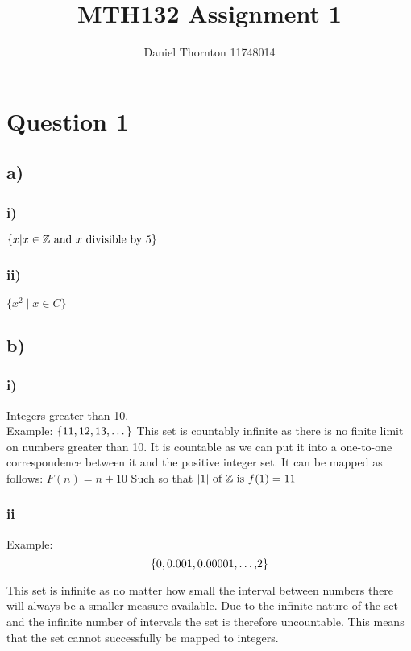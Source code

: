 \documentclass[english,10pt,a4paper]{report}
\title{MTH132 Assignment 1}
\author{Daniel Thornton 11748014 }
\begin{document}
	\pagestyle{fancy}
	\fancyhead{}
\fancyfoot{} %
\fancyfoot[LE,RO]{\thepage}
\maketitle

\section{Question 1}
\subsection*{a)}
	\hspace{2cm}\begin{minipage}{\dimexpr\textwidth-2cm}
	\indent	\subsubsection*{i)}
	$ \{x \vert x \in \mathbb{Z}	  \textmd{ and } x \textmd{ divisible by }  5\} $
	
	\subsubsection*{ii)}
	$ \{ x^2 \mid x \in C \} $
	
	\end{minipage}
	

\subsection*{b)}
\hspace{2cm}\begin{minipage}{\dimexpr\textwidth-2cm}
	\subsubsection*{i)}
	Integers greater than 10. 
	\\
	Example:
	$\{11,12,13,\textmd{…}\}$
	This set is countably infinite as there is no finite limit on numbers greater than 10.
	It is countable as we can put it into a one-to-one correspondence between it and the positive integer set. It can be mapped as follows:
	$F(n)= n + 10$
	Such so that
	$ \vert1\vert \textmd{ of } \mathbb{Z} \textmd{ is } f(1)=11 $
	
	\subsubsection*{ii}
	Example:
	\[\{0,0.001,0.00001,\textmd{…,}2\}\]
	
	This set is infinite as no matter how small the interval between numbers there will always be a smaller measure available. Due to the infinite nature of the set and the infinite number of intervals the set is therefore uncountable. This means that the set cannot successfully be mapped to integers.
\end{minipage}
\end{document}
